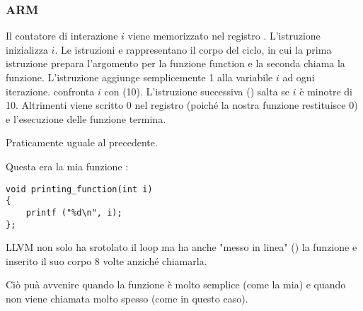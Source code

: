 \subsubsection{ARM}

\myparagraph{\NonOptimizingKeilVI (\ARMMode)}



Il contatore di interazione $i$ viene memorizzato nel registro .
L'istruzione  inizializza $i$.
Le istruzioni  e  rappresentano il corpo del ciclo, in cui la prima istruzione prepara
l'argomento per la funzione \ttf function e la seconda chiama la funzione.
L'istruzione   aggiunge semplicemente 1 alla variabile $i$ ad ogni iterazione.
 confronta $i$ con  (10). 
L'istruzione successiva  () salta se $i$ è minotre di 10.
Altrimenti viene scritto 0 nel registro  (poiché la nostra funzione restituisce 0) e l'esecuzione delle funzione termina.

\myparagraph{\OptimizingKeilVI (\ThumbMode)}



Praticamente uguale al precedente.

\myparagraph{\OptimizingXcodeIV (\ThumbTwoMode)}
\label{ARM_unrolled_loops}



Questa era la mia funzione \ttf :

\begin{lstlisting}[style=customc]
void printing_function(int i)
{
    printf ("%d\n", i);
};
\end{lstlisting}

LLVM non solo ha srotolato il loop ma ha anche "messo in linea" () la funzione \ttf e inserito il suo corpo 8 volte
anziché chiamarla.

Ciò puà avvenire quando la funzione è molto semplice (come la mia) e quando non viene chiamata molto spesso (come in questo caso).






